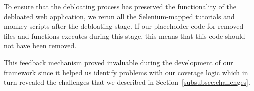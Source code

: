 %



To ensure that the debloating process has preserved the functionality of
the debloated web application, we rerun all the Selenium-mapped tutorials and monkey scripts
after the debloating stage. If our placeholder code for removed files and
functions executes during this stage, this means that this code should not
have been removed.

This feedback mechanism proved invaluable during the development of
our framework since it helped us identify problems with our coverage
logic which in turn revealed the challenges that we described in
Section~\ref{subsubsec:challenges}.


